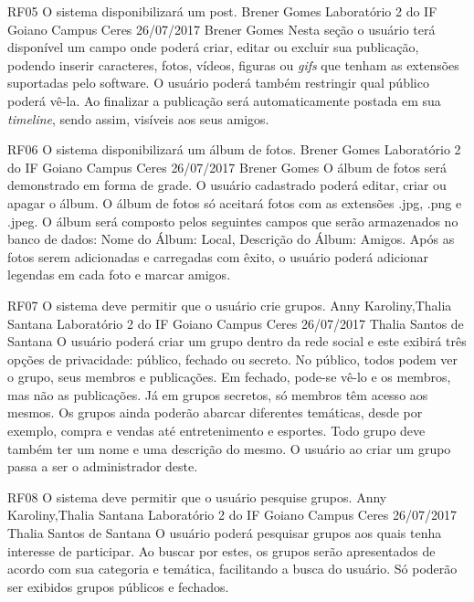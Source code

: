  \requisitoFuncional
 {RF05}
 {O sistema disponibilizará um post.}
 {Brener Gomes}
 {Laboratório 2 do IF Goiano Campus Ceres}
 {26/07/2017}
 {Brener Gomes}
 {Nesta seção o usuário terá disponível um campo onde poderá criar, editar ou excluir sua publicação, podendo inserir caracteres, fotos, vídeos, figuras ou \textit{gifs} que tenham as extensões suportadas pelo software. O usuário poderá também restringir qual público poderá vê-la. Ao finalizar a publicação será automaticamente postada em sua \textit{timeline}, sendo assim, visíveis aos seus amigos.
 }
 
 \requisitoFuncional
 {RF06}
 {O sistema disponibilizará um álbum de fotos.}
 {Brener Gomes}
 {Laboratório 2 do IF Goiano Campus Ceres}
 {26/07/2017}
 {Brener Gomes}
 {O álbum de fotos será demonstrado em forma de grade. O usuário cadastrado poderá editar, criar ou apagar o álbum. O álbum de fotos só aceitará fotos com as extensões .jpg, .png e .jpeg. O álbum será composto pelos seguintes campos que serão armazenados no banco de dados:
  Nome do Álbum:
  Local,
  Descrição do Álbum:
  Amigos.
  Após as fotos serem adicionadas e carregadas com êxito, o usuário poderá adicionar legendas em cada foto e marcar amigos.
 }
 
 \requisitoFuncional
 {RF07}
 {O sistema deve permitir que o usuário crie grupos.}
 {Anny Karoliny,Thalia Santana}
 {Laboratório 2 do IF Goiano Campus Ceres}
 {26/07/2017}
 {Thalia Santos de Santana}
 {O usuário poderá criar um grupo dentro da rede social e este exibirá três opções de privacidade: público, fechado ou secreto. No público, todos podem ver o grupo, seus membros e publicações. Em fechado, pode-se vê-lo e os membros, mas não as publicações. Já em grupos secretos, só membros têm acesso aos mesmos. Os grupos ainda poderão abarcar diferentes temáticas, desde por exemplo, compra e vendas até entretenimento e esportes. Todo grupo deve também ter um nome e uma descrição do mesmo. O usuário ao criar um grupo passa a ser o administrador deste.
 }
 
 \requisitoFuncional
 {RF08}
 {O sistema deve permitir que o usuário pesquise grupos.}
 {Anny Karoliny,Thalia Santana}
 {Laboratório 2 do IF Goiano Campus Ceres}
 {26/07/2017}
 {Thalia Santos de Santana}
 {O usuário poderá pesquisar grupos aos quais tenha interesse de participar. Ao buscar por estes, os grupos serão apresentados de acordo com sua categoria e temática, facilitando a busca do usuário. Só poderão ser exibidos grupos públicos e fechados.
 }
 
